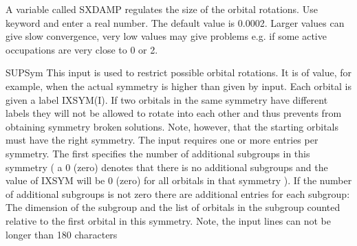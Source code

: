 \begin{keywordlist}
A variable called SXDAMP regulates the size of the orbital rotations.
Use keyword  and enter a real number.
The default value is 0.0002. Larger values can give slow
convergence, very low values may give problems e.g. if some active
occupations are very close to 0 or 2.
\item[SUPSym]
This input is used to restrict possible orbital
rotations. It is of value, for example, when the actual symmetry is
higher than given by input. Each orbital is given a label IXSYM(I).
If two orbitals in the same symmetry have different labels they will
not be allowed to rotate into each other and thus prevents from obtaining
symmetry broken solutions. Note, however, that the starting orbitals must
have the right symmetry. The input requires one or more entries
per symmetry. The first specifies the number of additional subgroups in this
symmetry ( a 0 (zero) denotes that there is no additional subgroups and the
value of IXSYM will be 0 (zero) for all orbitals in that symmetry ).
If the number of additional subgroups is not zero there are additional
entries for each subgroup: The dimension of the subgroup and
the list of orbitals in the subgroup counted relative to the first orbital
in this symmetry. Note, the input lines can not be longer than 180 characters

\end{keywordlist}
